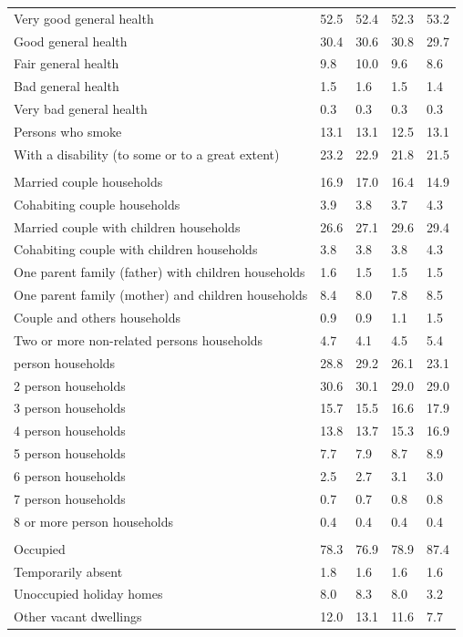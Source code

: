 \documentclass{article}
\begin{document}
\begin{table}[h]
\begin{tabular}{KTTTT}
    \hline
Very good general health & 52.5& 52.4&52.3& 53.2\\
Good general health & 30.4& 30.6& 30.8& 29.7\\
Fair general health &  9.8& 10.0& 9.6&  8.6\\
Bad general health & 1.5& 1.6&1.5& 1.4\\
Very bad general health & 0.3& 0.3&0.3& 0.3\\
    \hline
Persons who smoke & 13.1& 13.1&12.5& 13.1\\
    \hline
With a disability (to some or to a great extent) & 23.2& 22.9&21.8& 21.5\\
\hline
    \\ 
    \hline
Married couple households & 16.9& 17.0& 16.4& 14.9\\
Cohabiting couple households & 3.9& 3.8& 3.7& 4.3\\
Married couple with children households & 26.6& 27.1& 29.6& 29.4\\
Cohabiting couple with children households & 3.8& 3.8& 3.8& 4.3\\
One parent family (father) with  children households & 1.6& 1.5& 1.5& 1.5\\
One parent family (mother) and children households & 8.4& 8.0& 7.8& 8.5\\
Couple and others households  & 0.9& 0.9& 1.1& 1.5\\
Two or more non-related persons households & 4.7& 4.1& 4.5& 5.4\\
     person households & 28.8& 29.2& 26.1& 23.1\\
2 person households & 30.6& 30.1& 29.0& 29.0\\
3 person households & 15.7& 15.5& 16.6& 17.9\\
4 person households & 13.8& 13.7& 15.3& 16.9\\
5 person households & 7.7& 7.9& 8.7& 8.9\\
6 person households & 2.5& 2.7& 3.1& 3.0\\
7 person households & 0.7& 0.7& 0.8& 0.8\\
8 or more person households & 0.4& 0.4& 0.4& 0.4\\
\hline
    \\ 
    \hline
Occupied & 78.3& 76.9& 78.9& 87.4\\
Temporarily absent & 1.8& 1.6& 1.6& 1.6\\
Unoccupied holiday homes & 8.0& 8.3& 8.0& 3.2\\
Other vacant dwellings & 12.0& 13.1& 11.6&  7.7\\
\hline
\end{tabular}
\end{table}
\end{document}
